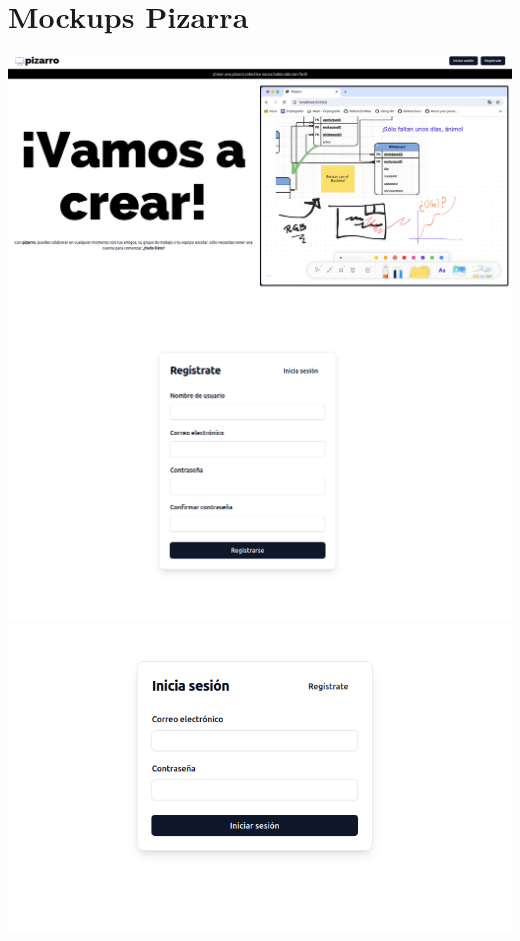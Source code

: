 \documentclass[a4paper, oneside, final]{scrartcl}
\begin{document}
\section{Mockups Pizarra}
\includegraphics[width= \textwidth]{images/mock0.png}
\includegraphics[width= \textwidth]{images/mock01.png} \\
\includegraphics[width= \textwidth]{images/mock02.png} \\
\end{document}
